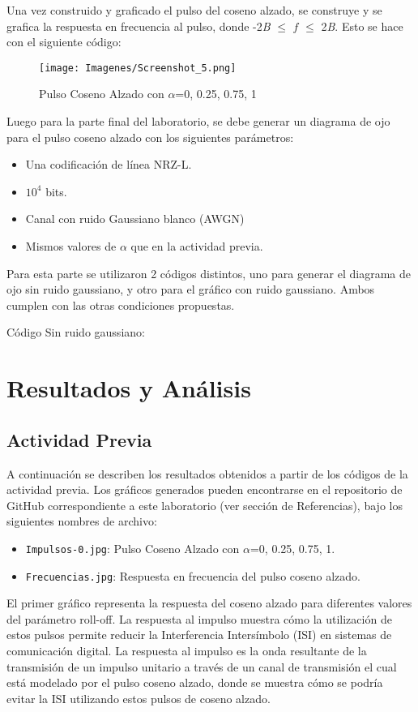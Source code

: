\documentclass[lettersize,journal]{IEEEtran}
\begin{document}
Una vez construido y graficado el pulso del coseno alzado, se construye y se grafica la respuesta en frecuencia al pulso, donde -2\textit{B} $\leq$ $f$ $\leq$ 2\textit{B}. Esto se hace con el siguiente código:

\begin{figure}[H]
        \centering
        \texttt{[image: Imagenes/Screenshot\_5.png]}
        \label{fig:a1}
        \caption{Pulso Coseno Alzado con $\alpha$=0, 0.25, 0.75, 1}
\end{figure}
Luego para la parte final del laboratorio, se debe generar un diagrama de ojo para el pulso coseno alzado con los siguientes parámetros:
\begin{itemize}
    \item Una codificación de línea NRZ-L.
    \item $10^4$ bits.
    \item Canal con ruido Gaussiano blanco (AWGN)
    \item Mismos valores de $\alpha$ que en la actividad previa.
\end{itemize}
Para esta parte se utilizaron 2 códigos distintos, uno para generar el diagrama de ojo sin ruido gaussiano, y otro para el gráfico con ruido gaussiano. Ambos cumplen con las otras condiciones propuestas.

Código Sin ruido gaussiano:

\section{Resultados y Análisis}\label{sec:resultados}
\subsection{Actividad Previa}
A continuación se describen los resultados obtenidos a partir de los códigos de la actividad previa. Los gráficos generados pueden encontrarse en el repositorio de GitHub correspondiente a este laboratorio (ver sección de Referencias), bajo los siguientes nombres de archivo:

\begin{itemize}
    \item \texttt{Impulsos-0.jpg}: Pulso Coseno Alzado con $\alpha$=0, 0.25, 0.75, 1.
    \item \texttt{Frecuencias.jpg}: Respuesta en frecuencia del pulso coseno alzado.
\end{itemize}

El primer gráfico representa la respuesta del coseno alzado para diferentes valores del parámetro roll-off. La respuesta al impulso muestra cómo la utilización de estos pulsos permite reducir la Interferencia Intersímbolo (ISI) en sistemas de comunicación digital.
La respuesta al impulso es la onda resultante de la transmisión de un impulso unitario a través de un canal de transmisión el cual está modelado por el pulso coseno alzado, donde se muestra cómo se podría evitar la ISI utilizando estos pulsos de coseno alzado.
\end{document}
